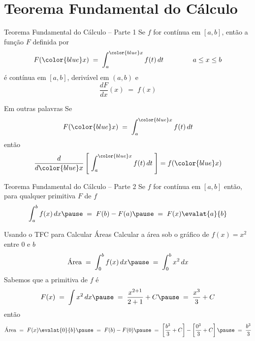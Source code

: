 \section{Teorema Fundamental do Cálculo}

\begin{frame}{Teorema Fundamental do Cálculo -- Parte 1}
  Se $f$ for {\color{blue} contínua} em $[a, b]$,
  \pause
  então a função $F$ definida por
  \[
    F({\color{blue}x})
    \;=\; \int_a^{{\color{blue}x}} f(t)\,dt
    \hspace{15mm} a \leq x \leq b
  \]
  \pause
  é contínua em $[a, b]$,
  \pause
  derivável em $(a, b)$
  \pause
  e
  \[
    \frac{dF}{dx}(x) \;=\; f(x)
  \]
\end{frame}

\begin{frame}{Em outras palavras}
  Se
  \[
    F({\color{blue}x})
    \;=\; \int_a^{{\color{blue}x}} f(t)\,dt
  \]
  \pause
  então
  \[
    \frac{d}{d{\color{blue}x}}
    \left[\; \int_a^{{\color{blue}x}} f(t)\,dt \;\right]
    = f({\color{blue}x})
  \]
\end{frame}

\begin{frame}{Teorema Fundamental do Cálculo -- Parte 2}
  Se $f$ for {\color{blue} contínua} em $[a, b]$
  \pause
  então, para {\color{blue}qualquer primitiva} $F$ de $f$
  \[
    \int_a^b f(x) \,dx      \pause
    \;=\; F(b) - F(a)       \pause
    \;=\; F(x) \evalat{a}{b}
  \]
\end{frame}

\begin{frame}{Usando o TFC para Calcular Áreas}
  Calcular a área sob o gráfico de \(f(x)=x^2\) entre 0 e $b$
  \pause
  \[
    \text{Área}
    \;=\; \int_0^b f(x) \,dx \pause
    \;=\; \int_0^b x^2  \,dx
  \]
  \pause
  Sabemos que a primitiva de $f$ é
  \[
    F(x)
    \;=\; \int x^2  \,dx \pause
    \;=\; \frac{x^{2+1}}{2+1} + C \pause
    \;=\; \frac{x^3}{3} + C
  \]
  \pause
  então
  \[
    \text{Área}
    \;=\; F(x) \evalat{0}{b} \pause
    \;=\; F(b) - F(0)        \pause
    \;=\; \left[ \frac{b^3}{3} + C \right]
      -   \left[ \frac{0^3}{3} + C \right] \pause
    \;=\; \frac{b^3}{3}
  \]
\end{frame}

